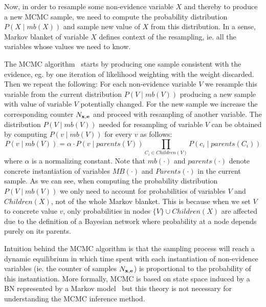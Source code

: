 \documentclass[english,cover]{fitthesis} %
\newcommand{\vars}[1]{{\bold{#1}}}         %
\begin{document}
Now, in order to resample some non-evidence variable $X$ and thereby to produce a new MCMC sample, we need to compute the probability distribution $P(X \mid mb(X))$ and sample new value of $X$ from this distribution. In a sense, Markov blanket of variable $X$ defines context of the resampling, ie. all the variables whose values we need to know.

The MCMC algorithm~\cite[p.~516]{russell_norvig_ed2} starts by producing one sample consistent with the evidence, eg. by one iteration of likelihood weighting with the weight discarded. Then we repeat the following: For each non-evidence variable $V$ we resample this variable from the current distribution $P(V \mid mb(V))$ producing a new sample with value of variable $V$ potentially changed. For the new sample we increase the corresponding counter $N_{\vars{x},\vars{e}}$ and proceed with resampling of another variable. The distribution $P(V \mid mb(V))$ needed for resampling of variable $V$ can be obtained by computing $P(v \mid mb(V))$ for every $v$ as follows:
\begin{equation*}
    P(v \mid mb(V)) = \alpha \cdot P(v \mid parents(V)) \!\!\!\!\!\!\!\! \prod_{C_i \in Children(V)} \!\!\!\!\!\!\!\!\!\!\!\! P(c_i \mid parents(C_i))
\end{equation*}
where $\alpha$ is a normalizing constant. Note that $mb(\cdot)$ and $parents(\cdot)$ denote concrete instantiation of variables $MB(\cdot)$ and $Parents(\cdot)$ in the current sample. As we can see, when computing the probability distribution $P(V \mid mb(V))$ we only need to account for probabilities of variables $V$ and $Children(X)$, not of the whole Markov blanket. This is because when we set $V$ to concrete value $v$, only probabilities in nodes $\lbrace V \rbrace \cup Children(X)$ are affected due to the definition of a Bayesian network where probability at a node depends purely on its parents.

Intuition behind the MCMC algorithm is that the sampling process will reach a dynamic equilibrium in which time spent with each instantiation of non-evidence variables (ie. the counter of samples $N_{\vars{x},\vars{e}}$) is proportional to the probability of this instantiation. More formally, MCMC is based on state space induced by a BN represented by a Markov model~\cite[p.~516]{russell_norvig_ed2} but this theory is not necessary for understanding the MCMC inference method.

\end{document}
